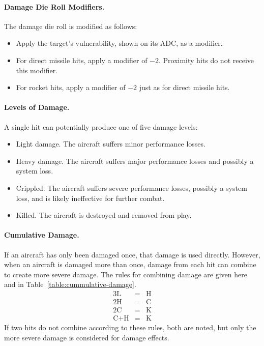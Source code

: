 {\paragraph{Damage Die Roll Modifiers.} The damage die roll is modified as follows:

\begin{itemize}

    \item Apply the target's vulnerability, shown on its ADC, as a modifier.
    
    \item For direct missile hits, apply a modifier of $-2$. Proximity hits do not receive this modifier.    
    
    \item For rocket hits, apply a modifier of $-2$ just as for direct missile hits.
    
\end{itemize}

\paragraph{Levels of Damage.} A single hit can potentially produce one of five damage levels:

\begin{itemize}

    \item{} Light damage. The aircraft suffers minor performance losses.

    \item{} Heavy damage. The aircraft suffers major performance losses and possibly a system loss.

    \item{} Crippled. The aircraft suffers severe performance losses, possibly a system loss, and is likely ineffective for further combat.
    
    \item{} Killed. The aircraft is destroyed and removed from play.

\end{itemize}



\paragraph{Cumulative Damage.} 
If an aircraft has only been damaged once, that damage is used directly. However, when an aircraft is damaged more than once,
damage from each hit can combine to create more severe damage. The rules for combining damage are given here and in Table~\ref{table:cummulative-damage}.
\begin{eqnarray*}
3\textrm{L}&=&\textrm{H}\\
2\textrm{H}&=&\textrm{C}\\
2\textrm{C}&=&\textrm{K}\\
\textrm{C} + \textrm{H}&=&\textrm{K}
\end{eqnarray*}
If two hits do not combine according to these rules, both are noted, but only the more severe damage is considered for damage effects.

}
